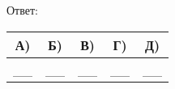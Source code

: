 \sepline
Ответ: \\
\begin{tabular}{|c|c|c|c|c|}
\hline
А) & Б) & В) & Г) & Д) \\
\hline
__ & __ & __ & __ & __\\
\hline
\end{tabular}